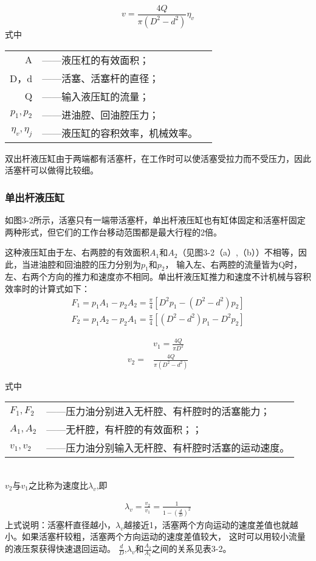 
\begin{equation}
    v=\frac{4Q}{\pi(D^2-d^2)}\eta_v    
\end{equation}
\noindent 式中 
\begin{tabular}[t]{rll}
 A &——液压杠的有效面积；\\
 D，d&——活塞、活塞杆的直径；\\
 Q &——输入液压缸的流量；\\
 $p_1,p_2$ &——进油腔、回油腔压力；\\
 $\eta_v,\eta_j$ &——液压缸的容积效率，机械效率。
\end{tabular}

双出杆液压缸由于两端都有活塞杆，在工作时可以使活塞受拉力而不受压力，因此活塞杆可以做得比较细。
\subsubsection {单出杆液压缸}

如图3-2所示，活塞只有一端带活塞杆，单出杆液压缸也有缸体固定和活塞杆固定两种形式，但它们的工作台移动范围都是最大行程的2倍。

这种液压缸由于左、右两腔的有效面积$A_1$和$A_2$（见图3-2（a）,（b））不相等，因此，当进油腔和回油腔的压力分别为$p_1$和$p_2$，
输入左、右两腔的流量皆为Q时，左、右两个方向的推力和速度亦不相同。单出杆液压缸推力和速度不计机械与容积效率时的计算式如下：
\begin{align}
    F_1=p_1A_1-p_2A_2=\frac {\pi}{4}[D^2p_1-(D^2-d^2)p_2]\\
    F_2=p_1A_2-p_2A_1=\frac {\pi}{4}[(D^2-d^2)p_1-D^2p_2]        
\end{align}
\newpage
    
\begin{align}
&v_1=\frac{4Q}{\pi D^2}\\
v_2=&\frac{4Q}{\pi (D^2-d^2)}
\end{align}

\noindent 式中 
\begin{tabular}[t]{ll}
 $F_1,F_2$ &——压力油分别进入无杆腔、有杆腔时的活塞能力；\\
 $A_1,A_2$ &——无杆腔，有杆腔的有效面积；；\\
 $v_1,v_2$ &——压力油分别输入无杆腔、有杆腔时活塞的运动速度。\\
\end{tabular}\\

$v_2$与$v_1$之比称为速度比$\lambda _v$,即

\begin{align}
    \lambda _v=\frac{v_2}{v_1}=\frac{1}{1-(\frac{d}{D})^2}
\end{align}
上式说明：活塞杆直径越小，$\lambda _v$越接近1，活塞两个方向运动的速度差值也就越小。如果活塞杆较粗，活塞两个方向运动的速度差值较大，
这时可以用较小流量的液压泵获得快速退回运动。
$\displaystyle\tfrac{d}{D}$,$\lambda_v$和$\tfrac{A_2}{A_1}$之间的关系见表3-2。 \\

